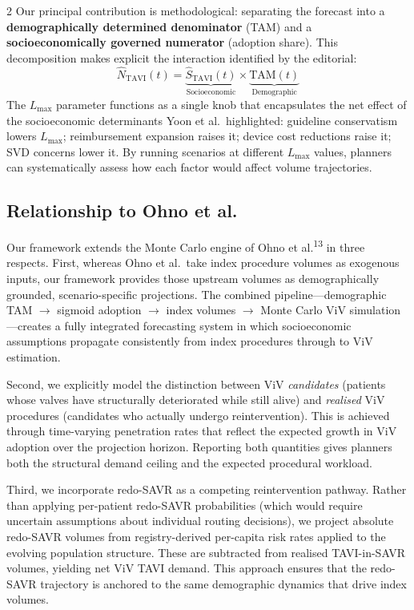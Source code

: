 \documentclass[10pt, a4paper]{article}
\begin{document}
\begin{multicols}{2}
Our principal contribution is methodological: separating the forecast into a \textbf{demographically determined denominator} (TAM) and a \textbf{socioeconomically governed numerator} (adoption share). This decomposition makes explicit the interaction identified by the editorial:
%
\begin{equation}
\hat{N}_{\mathrm{TAVI}}(t) = \underbrace{\hat{S}_{\mathrm{TAVI}}(t)}_{\text{Socioeconomic}} \times \underbrace{\mathrm{TAM}(t)}_{\text{Demographic}}
\end{equation}
%
The $L_{\max}$ parameter functions as a single knob that encapsulates the net effect of the socioeconomic determinants Yoon et al.\ highlighted: guideline conservatism lowers $L_{\max}$; reimbursement expansion raises it; device cost reductions raise it; SVD concerns lower it. By running scenarios at different $L_{\max}$ values, planners can systematically assess how each factor would affect volume trajectories.

\subsection{Relationship to Ohno et al.}

Our framework extends the Monte Carlo engine of Ohno et al.\textsuperscript{13} in three respects. First, whereas Ohno et al.\ take index procedure volumes as exogenous inputs, our framework provides those upstream volumes as demographically grounded, scenario-specific projections. The combined pipeline---demographic TAM $\to$ sigmoid adoption $\to$ index volumes $\to$ Monte Carlo ViV simulation---creates a fully integrated forecasting system in which socioeconomic assumptions propagate consistently from index procedures through to ViV estimation.

Second, we explicitly model the distinction between ViV \emph{candidates} (patients whose valves have structurally deteriorated while still alive) and \emph{realised} ViV procedures (candidates who actually undergo reintervention). This is achieved through time-varying penetration rates that reflect the expected growth in ViV adoption over the projection horizon. Reporting both quantities gives planners both the structural demand ceiling and the expected procedural workload.

Third, we incorporate redo-SAVR as a competing reintervention pathway. Rather than applying per-patient redo-SAVR probabilities (which would require uncertain assumptions about individual routing decisions), we project absolute redo-SAVR volumes from registry-derived per-capita risk rates applied to the evolving population structure. These are subtracted from realised TAVI-in-SAVR volumes, yielding net ViV TAVI demand. This approach ensures that the redo-SAVR trajectory is anchored to the same demographic dynamics that drive index volumes.


\end{multicols}
\end{document}
